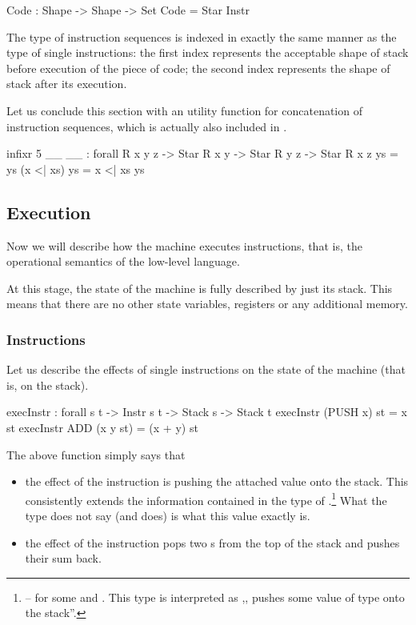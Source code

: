 \begin{code}
  Code : Shape -> Shape -> Set
  Code = Star Instr
\end{code}

\noindent The type of instruction sequences is indexed in exactly the same
manner as the type of single instructions: the first index represents the
acceptable shape of stack before execution of the piece of code; the second
index represents the shape of stack after its execution.

Let us conclude this section with an utility function for concatenation of
instruction sequences, which is actually also included in .

\begin{code}
  infixr 5 _\app\_
  _\app\_ : forall {R x y z} -> Star R x y -> Star R y z -> Star R x z
  \nil \app ys = ys
  (x <| xs) \app ys = x <| xs \app ys
\end{code}

\subsection{Execution}

Now we will describe how the machine executes instructions, that is,
the operational semantics of the low-level language.

At this stage, the state of the machine is fully described by just its stack. This
means that there are no other state variables, registers or any additional
memory.

\subsubsection{Instructions}

Let us describe the effects of single instructions on the state of the machine
(that is, on the stack).

\begin{code}
  execInstr : forall {s t} -> Instr s t -> Stack s -> Stack t
  execInstr (PUSH x) st = x \scons st
  execInstr ADD (x \scons y \scons st) = (x + y) \scons st
\end{code}

\noindent The above function simply says that
\begin{itemize}
  \item the effect of the instruction  is pushing the attached
    value onto the stack. This consistently extends the information contained
    in the type of .\footnote{ -- for
    some  and . This type is interpreted as ,,
    pushes some value of type  onto the stack''.}
    What the type does not say (and 
    does) is what this value exactly is.
  \item the effect of the instruction  pops two s from
    the top of the stack and pushes their sum back.
\end{itemize}

